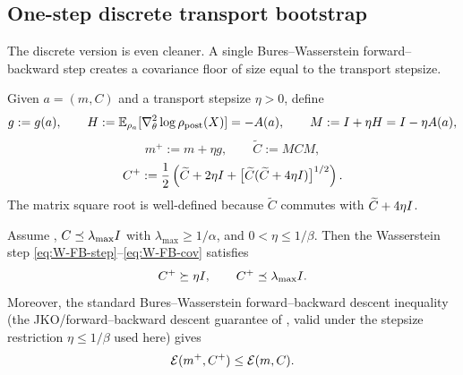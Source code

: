 \subsection{One-step discrete transport bootstrap}

The discrete version is even cleaner. A single Bures--Wasserstein forward--backward step creates
a covariance floor of size equal to the transport stepsize.

Given $a=(m,C)$ and a transport stepsize $\eta>0$, define
\begin{equation}
\label{eq:W-FB-step}
    g:=g(a),
    \qquad
    H:=\mathbb{E}_{\rho_a}[\nabla_\theta^2\log\rho_{\mathrm{post}}(X)]=-A(a),
    \qquad
    M:=I+\eta H=I-\eta A(a),
\end{equation}
\[
    m^+:=m+\eta g,
    \qquad
    \widetilde C:=MCM,
\]
\begin{equation}
\label{eq:W-FB-cov}
    C^+
    :=
    \frac12
    \left(
        \widetilde C+2\eta I+\bigl[\widetilde C(\widetilde C+4\eta I)\bigr]^{1/2}
    \right).
\end{equation}
The matrix square root is well-defined because $\widetilde C$ commutes with
$\widetilde C+4\eta I$.

\begin{lemma}
\label{lem:one-step-W-bootstrap}
Assume , $C\preceq\lambda_{\max}I$ with
$\lambda_{\max}\ge1/\alpha$, and $0<\eta\le1/\beta$. Then the Wasserstein step
\eqref{eq:W-FB-step}--\eqref{eq:W-FB-cov} satisfies
\[
    C^+\succeq\eta I,
    \qquad
    C^+\preceq\lambda_{\max}I.
\]
Moreover, the standard Bures--Wasserstein forward--backward descent inequality
(the JKO/forward--backward descent guarantee of \citet{diao2023forward}, valid under the
stepsize restriction $\eta\le1/\beta$ used here) gives
\[
    \mathcal{E}(m^+,C^+)\le\mathcal{E}(m,C).
\]
\end{lemma}

